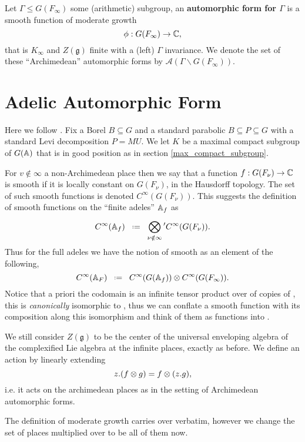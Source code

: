 	\begin{Definition}
		Let \(\Gamma\leq G(F_\infty)\) some (arithmetic) subgroup, an \textbf{automorphic form for \(\Gamma\)} is a smooth function of moderate growth 
		\[\phi: G(F_\infty) \to \C,\]
		that is \(K_\infty\) and \(Z(\mathfrak{g})\) finite with a (left) \(\Gamma\) invariance. We denote the set of these ``Archimedean'' automorphic forms by \(\mathcal{A}(\Gamma \backslash G(F_\infty))\).
	\end{Definition}


\section{Adelic Automorphic Form}
Here we follow \cite[I.2.17]{moeglinSpectralDecompositionEisenstein1995}. Fix a Borel \(B\subseteq G\) and a standard parabolic \(B\subseteq P \subseteq G\) with a standard Levi decomposition \(P = MU\). We let \(K\) be a maximal compact subgroup of \(G(\A)\) that is in good position as in section \ref{max_compact_subgroup}.

For \(v\notin \infty\) a non-Archimedean place then we say that a function \(f: G(F_\nu) \to \C\) is smooth if it is locally constant on \(G(F_\nu)\), in the Hausdorff topology. The set of such smooth functions is denoted \(C^\infty(G(F_\nu))\). This suggests the definition of smooth functions on the ``finite adeles'' \(\A_f\) as 
	\[C^\infty(\mathbb{A}_f) \defeq \bigotimes^{}_{\nu \notin \infty} \phantom{}' C^\infty(G(F_\nu)). \]
	Thus for the full adeles we have the notion of smooth as an element of the following,
	\[C^\infty(\mathbb{A}_F) \defeq   C^\infty(G(\mathbb{A}_f))   \otimes   C^\infty(G(F_\infty)).\]
	Notice that a priori the codomain is an infinite tensor product over \C of copies of \C, this is \textit{canonically} isomorphic to \C, thus we can conflate a smooth function with its composition along this isomorphism and think of them as functions into \C.

	We still consider \(Z(\mathfrak{g})\) to be the center of the universal enveloping algebra of the complexified Lie algebra at the infinite places, exactly as before. We define an action by linearly extending
    \[z.(f\otimes g) = f\otimes (z.g),\]
    i.e. it acts on the archimedean places as in the setting of Archimedean automorphic forms. 
	
	The definition of moderate growth carries over verbatim, however we change the set of places multiplied over to be all of them now.
    
